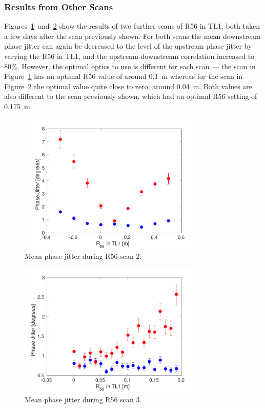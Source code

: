 \subsubsection{Results from Other Scans}

Figures~\ref{f:r56Scan2_meanJitter}~and~\ref{f:r56Scan3_meanJitter} show the results of two further scans of R56 in TL1, both taken a few days after the scan previously shown. For both scans the mean downstream phase jitter can again be decreased to the level of the upstream phase jitter by varying the R56 in TL1, and the upstream-downstream correlation increased to 80\%. However, the optimal optics to use is different for each scan --- the scan in Figure~\ref{f:r56Scan2_meanJitter} has an optimal R56 value of around 0.1~m whereas for the scan in Figure~\ref{f:r56Scan3_meanJitter} the optimal value quite close to zero, around 0.04~m. Both values are also different to the scan previously shown, which had an optimal R56 setting of 0.175~m.

\begin{figure}
  \centering
  \includegraphics[width=0.8\textwidth]{Figures/propagation/r56Scan2_meanJitter}
  \caption{Mean phase jitter during R56 scan 2.}
  \label{f:r56Scan2_meanJitter}
\end{figure}

\begin{figure}
  \centering
  \includegraphics[width=0.8\textwidth]{Figures/propagation/r56Scan3_meanJitter}
  \caption{Mean phase jitter during R56 scan 3.}
  \label{f:r56Scan3_meanJitter}
\end{figure}

